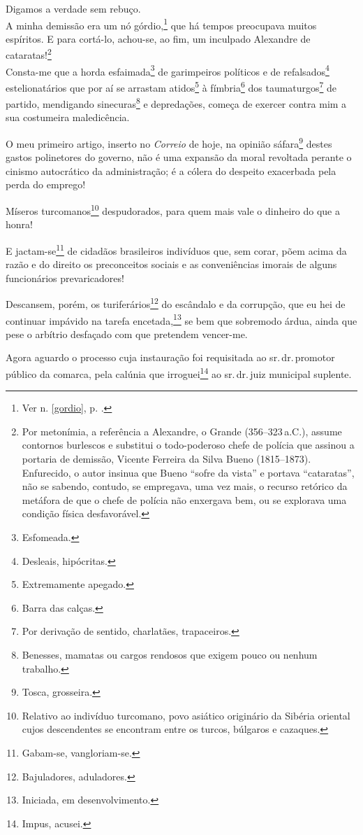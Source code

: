 Digamos a verdade sem rebuço.\\
A minha demissão era um nó górdio,\footnote{Ver n. \ref{gordio}, p. \pageref{gordio}.} 
que há tempos preocupava muitos espíritos. E para cortá-lo, achou-se, ao fim, 
um inculpado Alexandre de cataratas!\footnote{Por metonímia, a referência 
a Alexandre, o Grande (356--323\,a.C.), assume contornos burlescos e substitui 
o todo-poderoso chefe de polícia que assinou a portaria de demissão, Vicente 
Ferreira da Silva Bueno (1815--1873). Enfurecido, o autor insinua que Bueno
  ``sofre da vista'' e portava ``cataratas'', não se sabendo, contudo, se
  empregava, uma vez mais, o recurso retórico da metáfora de que o chefe
  de polícia não enxergava bem, ou se explorava uma condição física
  desfavorável.}\\
Consta-me que a horda esfaimada\footnote{Esfomeada.} de garimpeiros
políticos e de refalsados\footnote{Desleais, hipócritas.}
estelionatários que por aí se arrastam atidos\footnote{Extremamente
  apegado.} à fímbria\footnote{Barra das calças.} dos
taumaturgos\footnote{Por derivação de sentido, charlatães,
  trapaceiros.} de partido, mendigando sinecuras\footnote{Benesses,
  mamatas ou cargos rendosos que exigem pouco ou nenhum trabalho.} e
depredações, começa de exercer contra mim a sua costumeira maledicência.

O meu primeiro artigo, inserto no \emph{Correio} de hoje, na opinião
sáfara\footnote{Tosca, grosseira.} destes gastos polinetores do
governo, não é uma expansão da moral revoltada perante o cinismo
autocrático da administração; é a cólera do despeito exacerbada pela
perda do emprego!

Míseros turcomanos\footnote{Relativo ao indivíduo turcomano, povo
  asiático originário da Sibéria oriental cujos descendentes se
  encontram entre os turcos, búlgaros e cazaques.} despudorados, para
quem mais vale o dinheiro do que a honra!

E jactam-se\footnote{Gabam-se, vangloriam-se.} de cidadãos brasileiros
indivíduos que, sem corar, põem acima da razão e do direito os
preconceitos sociais e as conveniências imorais de alguns funcionários
prevaricadores!

Descansem, porém, os turiferários\footnote{Bajuladores, aduladores.}
do escândalo e da corrupção, que eu hei de continuar impávido na tarefa
encetada,\footnote{Iniciada, em desenvolvimento.} se bem que sobremodo
árdua, ainda que pese o arbítrio desfaçado com que pretendem vencer-me.

Agora aguardo o processo cuja instauração foi requisitada ao sr.\,dr.\,promotor público da comarca, pela calúnia que irroguei\footnote{Impus,
  acusei.} ao sr.\,dr.\,juiz municipal suplente.

